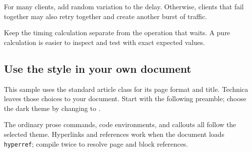 \documentclass{article}
\begin{document}
\begin{advice}
For many clients, add random variation to the delay. Otherwise, clients that
fail together may also retry together and create another burst of traffic.
\end{advice}

\begin{designrule}
Keep the timing calculation separate from the operation that waits. A pure
calculation is easier to inspect and test with exact expected values.
\end{designrule}

\subsection{Use the style in your own document}

This sample uses the standard article class for its page format and title.
Technica leaves those choices to your document. Start with the following
preamble; choose the dark theme by changing  to .


The ordinary prose commands, code environments, and callouts all follow the
selected theme. Hyperlinks and references work when the document loads
\texttt{hyperref}; compile twice to resolve page and block references.
\end{document}
